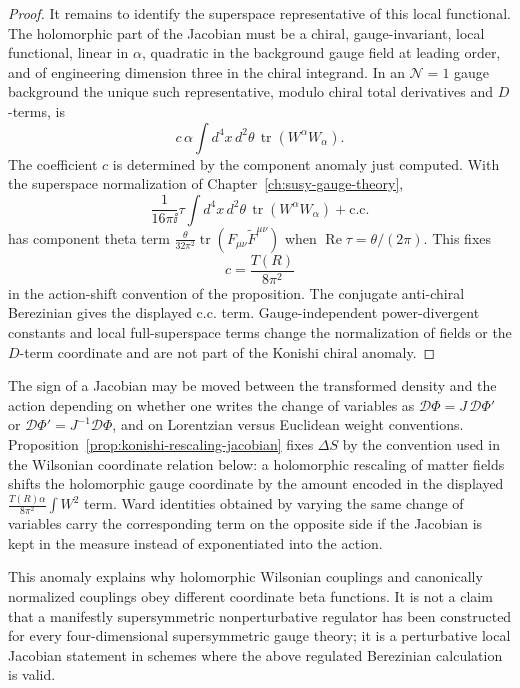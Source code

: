 \begin{proof}
It remains to identify the superspace representative of this local
functional.  The holomorphic part of the Jacobian must be a chiral,
gauge-invariant, local functional, linear in \(\alpha\), quadratic in the
background gauge field at leading order, and of engineering dimension three
in the chiral integrand.  In an \(\mathcal N=1\) gauge background the unique
such representative, modulo chiral total derivatives and \(D\)-terms, is
\[
  c\,\alpha\int d^4x\,d^2\theta\,
  \operatorname{tr}(W^\alpha W_\alpha).
\]
The coefficient \(c\) is determined by the component anomaly just computed.
With the superspace normalization of
Chapter~\ref{ch:susy-gauge-theory},
\[
  \frac{1}{16\pi\ii}\tau
  \int d^4x\,d^2\theta\,\operatorname{tr}(W^\alpha W_\alpha)
  +\text{c.c.}
\]
has component theta term
\(\frac{\theta}{32\pi^2}
\operatorname{tr}(F_{\mu\nu}\widetilde F^{\mu\nu})\) when
\(\operatorname{Re}\tau=\theta/(2\pi)\).  This fixes
\[
  c=\frac{T(R)}{8\pi^2}
\]
in the action-shift convention of the proposition.  The conjugate
anti-chiral Berezinian gives the displayed c.c. term.  Gauge-independent
power-divergent constants and local full-superspace terms change the
normalization of fields or the \(D\)-term coordinate and are not part of the
Konishi chiral anomaly.
\end{proof}

\begin{remark}
The sign of a Jacobian may be moved between the transformed density and the
action depending on whether one writes the change of variables as
\(\mathcal D\Phi=J\,\mathcal D\Phi'\) or
\(\mathcal D\Phi'=J^{-1}\mathcal D\Phi\), and on Lorentzian versus Euclidean
weight conventions.  Proposition~\ref{prop:konishi-rescaling-jacobian} fixes
\(\Delta S\) by the convention used in the Wilsonian coordinate relation
below: a holomorphic rescaling of matter fields shifts the holomorphic gauge
coordinate by the amount encoded in the displayed
\(\frac{T(R)\alpha}{8\pi^2}\int W^2\) term.  Ward identities obtained by
varying the same change of variables carry the corresponding term on the
opposite side if the Jacobian is kept in the measure instead of exponentiated
into the action.
\end{remark}

This anomaly explains why holomorphic Wilsonian couplings and canonically
normalized couplings obey different coordinate beta functions.  It is not a
claim that a manifestly supersymmetric nonperturbative regulator has been
constructed for every four-dimensional supersymmetric gauge theory; it is a
perturbative local Jacobian statement in schemes where the above regulated
Berezinian calculation is valid.

